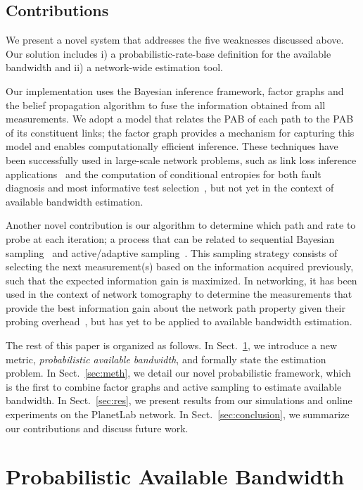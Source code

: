 \documentclass[final,5p,times,twocolumn]{elsarticle}
\begin{document}
\subsection{Contributions}

We present a novel system that addresses the five weaknesses discussed above.  Our solution includes i) a probabilistic-rate-base definition for the available bandwidth and ii) a network-wide estimation tool.  

Our implementation uses the Bayesian inference framework, factor graphs and the belief propagation algorithm to fuse the information obtained from all measurements.
We adopt a model that relates the PAB of each path to the PAB of its constituent links; the factor graph provides a mechanism for capturing this model and enables computationally efficient inference.  These techniques have been successfully used in large-scale network problems, such as link loss inference applications~\cite{coa:00,mao:05} and the computation of conditional entropies for both fault diagnosis and most informative test selection~\cite{ris:05distributed,zhe:05,ris:06}, but not yet in the context of available bandwidth estimation.  

Another novel contribution is our algorithm to determine which path and rate to probe at each iteration; 
a process that can be related to sequential Bayesian sampling~\cite{elg:93} and active/adaptive sampling~\cite{cas:07}.  
This sampling strategy consists of selecting the next measurement(s) based on the information acquired previously, such that the expected information gain is maximized.  
In networking, it has been used in the context of network tomography to determine the measurements that provide the best information gain about the network path property given their probing overhead~\cite{son:09}, but has yet to be applied to available bandwidth estimation.

The rest of this paper is organized as follows.  In Sect.~\ref{sec:pab}, we introduce a new metric, {\em probabilistic available bandwidth}, and formally state the estimation problem.  In Sect.~\ref{sec:meth}, we detail our novel probabilistic framework, which is the first to combine factor graphs and active sampling to estimate available bandwidth.  In Sect.~\ref{sec:res}, we present results from our simulations and online experiments on the PlanetLab network.  In Sect.~\ref{sec:conclusion}, we summarize our contributions and discuss future work.

\section{Probabilistic Available Bandwidth}
\label{sec:pab}
\end{document}
